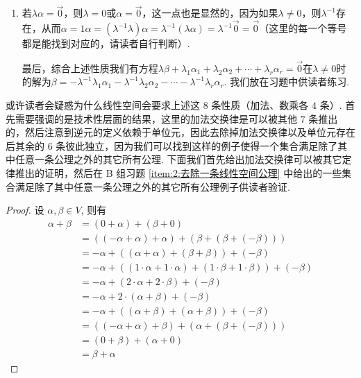 \begin{enumerate}
\begin{enumerate}
              \item 若$\lambda\alpha=\vec{0}$，则$\lambda=0$或$\alpha=\vec{0}$，这一点也是显然的，因为如果$\lambda\neq 0$，则$\lambda^{-1}$存在，从而$\alpha=1\alpha=(\lambda^{-1}\lambda)\alpha=\lambda^{-1}(\lambda\alpha)=\lambda^{-1}\vec{0}=\vec{0}$（这里的每一个等号都是能找到对应的，请读者自行判断）.

                    最后，综合上述性质我们有方程$\lambda\beta+\lambda_1\alpha_1+\lambda_2\alpha_2+\cdots+\lambda_r\alpha_r=\vec{0}$在$\lambda\neq 0$时的解为$\beta=-\lambda^{-1}\lambda_1\alpha_1-\lambda^{-1}\lambda_2\alpha_2-\cdots-\lambda^{-1}\lambda_r\alpha_r$. 我们放在习题中供读者练习.
          \end{enumerate}
\end{enumerate}

或许读者会疑惑为什么线性空间会要求上述这 $8$ 条性质（加法、数乘各 $4$ 条）. 首先需要强调的是技术性层面的结果，这里的加法交换律是可以被其他 $7$ 条推出的，然后注意到逆元的定义依赖于单位元，因此去除掉加法交换律以及单位元存在后其余的 $6$ 条彼此独立，因为我们可以找到这样的例子使得一个集合满足除了其中任意一条公理之外的其它所有公理. 下面我们首先给出加法交换律可以被其它定律推出的证明，然后在 B 组习题 \ref{item:2:去除一条线性空间公理} 中给出的一些集合满足除了其中任意一条公理之外的其它所有公理例子供读者验证.

\begin{proof}
{
    \allowdisplaybreaks
    设 $\alpha,\beta\in V$, 则有
    \begin{align*}
        \tag{加法单位元}
        \alpha + \beta &= (0 + \alpha) + (\beta + 0)\\
        \tag{逆元}
        &= ((-\alpha + \alpha) + \alpha) + (\beta + (\beta + (-\beta)))\\
        \tag{加法结合律}
        &= -\alpha + ((\alpha + \alpha) + (\beta + \beta)) + (-\beta)\\
        \tag{乘法单位元}
        &= -\alpha + ((1\cdot\alpha + 1\cdot\alpha) + (1\cdot\beta + 1\cdot\beta)) + (-\beta)\\
        \tag{左分配律}
        &= -\alpha + (2\cdot\alpha + 2\cdot\beta) + (-\beta)\\
        \tag{右分配律}
        &= -\alpha + 2\cdot (\alpha + \beta) + (-\beta)\\
        \tag{左分配律}
        &= -\alpha + ((\alpha + \beta) + (\alpha + \beta)) + (-\beta)\\
        \tag{加法结合律}
        &= ((-\alpha + \alpha) + \beta) + (\alpha + (\beta + (-\beta)))\\
        \tag{逆元}
        &= (0 + \beta) + (\alpha + 0)\\
        \tag{加法单位元}
        &= \beta + \alpha
    \end{align*}
}
\end{proof}

